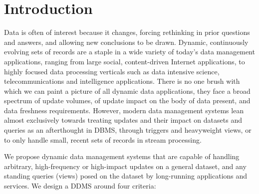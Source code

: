 





\section{Introduction}

Data is often of interest because it changes, forcing rethinking in prior
questions and answers, and allowing new conclusions to be drawn. Dynamic,
continuously evolving sets of records are a staple in a wide variety of today's
data management applications, ranging from large social, content-driven Internet
applications, to highly focused data processing verticals such as data intensive
science, telecommunications and intelligence applications. There is no one brush
with which we can paint a picture of all dynamic data applications, they face a
broad spectrum of update volumes, of update impact on the body of data present,
and data freshness requirements. However, modern data management systems lean
almost exclusively towards treating updates and their impact on datasets
and queries as an afterthought in DBMS, through triggers and heavyweight views,
or to only handle small, recent sets of records in stream processing.


We propose dynamic data management systems that are capable of handling
arbitrary, high-frequency or high-impact updates on a general dataset,
and any standing queries (views) posed on the dataset by long-running
applications and services. We design a DDMS around four criteria:

